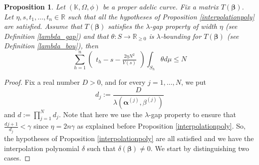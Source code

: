 \documentclass[10 pt,a4paper]{article}
\theoremstyle{plain}
\newtheorem{prop}[thm]{Proposition}
\theoremstyle{definition}
\theoremstyle{named}
\begin{document}
\begin{prop}\label{corvajaprop3.1} Let $(\mathbb K,\Omega, \phi)$ be a proper adelic curve. Fix a matrix $T(\bm{\beta})$. Let $\eta,s,t_1,\ldots,t_n\in\mathbb R$ such that all the hypotheses of Proposition \ref{interpolationpoly} are satisfied. Assume that $T(\bm{\beta})$ satisfies the $\lambda$-gap property of width $\eta$  (see Definition \ref{lambda_gap}) and that $\theta\colon S\to \mathbb R_{\ge 0}$ is $\lambda$-bounding for $T(\bm{\beta})$ (see Definition \ref{lambda_bou}), then
$$
\sum_{h=1}^{n}\begin{pmatrix}t_h-s-\frac{2\eta N^2}{V(s)}\end{pmatrix}\int_{ S_h}\theta d \mu\le N
$$
\end{prop}
\begin{proof} Fix a real number $D>0$, and for every $j=1,\dots, N$, we  put 
$$
d_{j}:=\frac{D}{\lambda(\bm{\alpha}^{(j)},\beta^{(j)})}
$$ 
and $d:=\prod^N_{j=1} d_j$. Note that here we use the $\lambda$-gap property to ensure that $\frac{d_{}j+1}{d_j}<\gamma$ since $\eta=2n\gamma$ as explained before Proposition \ref{interpolationpoly}. So, the hypotheses of Proposition \ref{interpolationpoly} are all satisfied and we have the interpolation polynomial $\delta$ such that $\delta(\bm{\beta})\neq 0$. We start by distinguishing two cases.



\end{proof}
\end{document}
